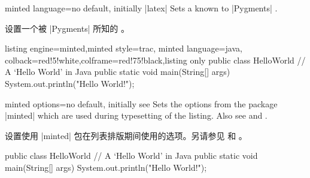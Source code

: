 \begin{docTcbKey}{minted language}{=}{no default, initially |latex|}
Sets a  known to |Pygments| \cite{pygments:web}.

设置一个被 |Pygments| \cite{pygments:web} 所知的 。
\begin{dispExample}
\begin{tcblisting}{listing engine=minted,minted style=trac,
minted language=java,
colback=red!5!white,colframe=red!75!black,listing only}
public class HelloWorld {
    // A `Hello World' in Java
    public static void main(String[] args) {
    System.out.println("Hello World!");
    }
}
\end{tcblisting}
\end{dispExample}
\end{docTcbKey}


\begin{docTcbKey}[][doc updated={2021-12-15}]{minted options}{=}{no default, initially
\linebreak see }
Sets the options from the package |minted| \cite{poore:minted}
which are used during typesetting of the listing.
Also see  and .

设置使用 |minted| \cite{poore:minted} 包在列表排版期间使用的选项。另请参见  和 。
\begin{dispExample}

\begin{myjava}
public class HelloWorld {
// A `Hello World' in Java
public static void main(String[] args) {
    System.out.println("Hello World!");
}
}
\end{myjava}
\end{dispExample}
\end{docTcbKey}


